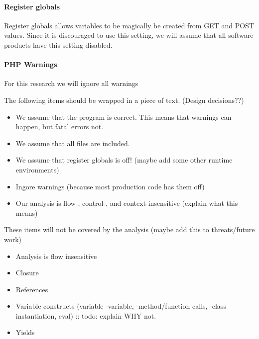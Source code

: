 \documentclass[../main.tex]{subfiles}
\begin{document}
    \paragraph{Register globals}
    Register globals allows variables to be magically be created from GET and POST values.
    Since it is discouraged to use this setting, we will assume that all software products have this setting disabled.
    
    \paragraph{PHP Warnings}
    For this research we will ignore all warnings
    
    The following items should be wrapped in a piece of text. (Design decisions??)
    \begin{itemize}
        \item We assume that the program is correct. This means that warnings can happen, but fatal errors not.
        \item We assume that all files are included.
        \item We assume that register globals is off! (maybe add some other runtime environments)
        \item Ingore warnings (because most production code has them off)
        \item Our analysis is flow-, control-, and context-insensitive (explain what this means)
    \end{itemize}
    These items will not be covered by the analysis (maybe add this to threats/future work)
    \begin{itemize}
        \item Analysis is flow insensitive
        \item Closure
        \item References
        \item Variable constructs (variable -variable, -method/function calls, -class instantiation, eval) :: todo: explain WHY not.
        \item Yields
    \end{itemize}
\end{document}
